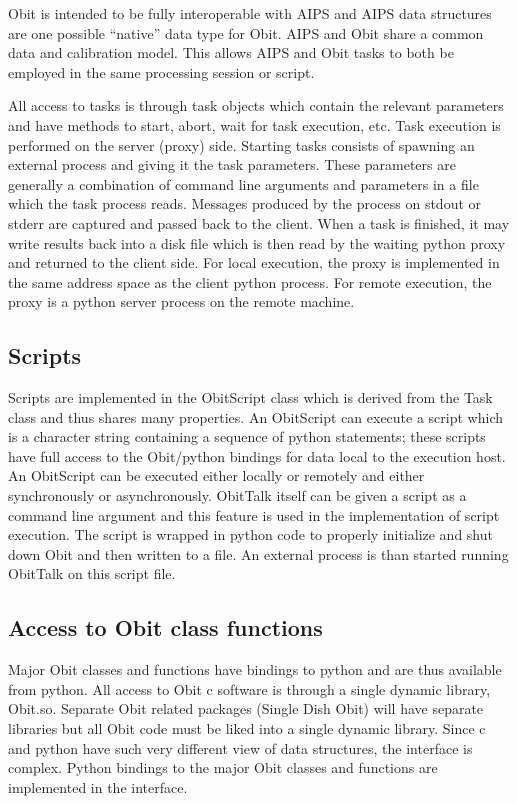 \documentclass[11pt]{report}
\begin{document}
Obit is intended to be fully interoperable with AIPS and AIPS data
structures are one possible ``native'' data type for Obit.
AIPS and Obit share a common data and calibration model.
This allows AIPS and Obit tasks to both be employed in the same
processing session or script.

All access to tasks is through task objects which contain the relevant
parameters and have methods to start, abort, wait for task execution,
etc. 
Task execution is performed on the server (proxy) side.
Starting tasks consists of spawning an external process and giving it
the task parameters.
These parameters are generally a combination of command line arguments
and parameters in a file which the task process reads.
Messages produced by the process on stdout or stderr are captured and
passed back to the client.
When a task is finished, it may write results back into a disk file
which is then read by the waiting python proxy and returned to the
client side.
For local execution, the proxy is implemented in the same address
space as the client python process.
For remote execution, the proxy is a python server process on the
remote machine.

\subsection{Scripts}
Scripts are implemented in the ObitScript class which is derived from
the Task class and thus shares many properties.
An ObitScript can execute a script which is a character string
containing a sequence of python statements; these scripts have full
access to the Obit/python bindings for data local to the execution host.
An ObitScript can be executed either locally or remotely and either
synchronously or asynchronously.
ObitTalk itself can be given a script as a command line argument and
this feature is used in the implementation of script execution.
The script is wrapped in python code to properly initialize and shut
down Obit and then written to a file.
An external process is than started running ObitTalk on this script file.

\subsection{Access to Obit class functions}
Major Obit classes and functions have bindings to python and are thus
available from python.
All access to Obit c software is through a single dynamic library,
Obit.so.
Separate Obit related packages (Single Dish Obit) will have separate
libraries but all Obit code must be liked into a single dynamic
library.
Since c and python have such very different view of data structures,
the interface is complex.
Python bindings to the major Obit classes and functions are
implemented in the interface.
\end{document}
